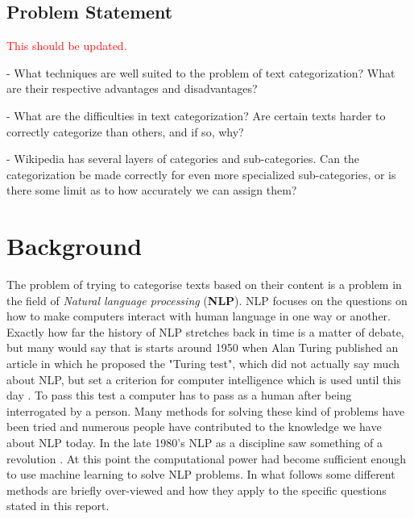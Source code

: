 \documentclass[a4paper]{article}
\begin{document}
\vspace{3mm}

\subsection{Problem Statement}

\vspace{3mm}

\textcolor{red}{This should be updated.}

- What techniques are well suited to the problem of text categorization? What are their respective advantages and disadvantages?

\vspace{3mm}

- What are the difficulties in text categorization? Are certain texts harder to correctly categorize than others, and if so, why?

\vspace{3mm}

- Wikipedia has several layers of categories and sub-categories. Can the categorization be made correctly for even more specialized sub-categories, or is there some limit as to how accurately we can assign them?


\vspace{3mm}


\section{Background}

\vspace{3mm}

The problem of trying to categorise texts based on their content is a problem in the field of \textit{Natural language processing} (\textbf{NLP}). NLP focuses on the questions on how to make computers interact with human language in one way or another.\\

Exactly how far the history of NLP stretches back in time is a matter of debate, but many would say that is starts around 1950 when Alan Turing published an article in which he proposed the "Turing test", which did not actually say much about NLP, but set a criterion for computer intelligence which is used until this day \cite{AI}. To pass this test a computer has to pass as a human after being interrogated by a person. Many methods for solving these kind of problems have been tried and numerous people have contributed to the knowledge we have about NLP today. In the late 1980's NLP as a discipline saw something of a revolution \cite{historyNLP}. At this point the computational power had become sufficient enough to use machine learning to solve NLP problems. In what follows some different methods are briefly over-viewed and how they apply to the specific questions stated in this report.\\
\end{document}
